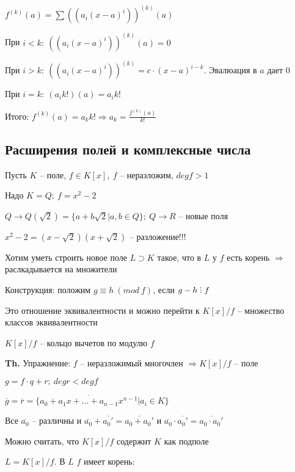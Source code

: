 \documentclass[14pt, letter paper]{article}
\def\divby{%
  \mathrel{\text{\vbox{\baselineskip.65ex\lineskiplimit0pt\hbox{.}\hbox{.}\hbox{.}}}}%
}
\begin{document}
$f^{(k)}(a) = \sum ((a_i(x - a)^i))^{(k)}(a)$

При $i < k:\ ((a_i(x - a)^i))^{(k)}(a) = 0$

При $i > k:\ ((a_i(x - a)^i))^{(k)} = c \cdot (x - a)^{i - k}$. Эвалюация в $a$ дает 0

При $i = k:\ (a_i k!)(a) = a_i k!$

Итого: $f^{(k)}(a) = a_k k! \Rightarrow a_k = \frac{f^{(k)}(a)}{k!}$

\vspace{5mm}

\begin{center}
    \section*{Расширения полей и комплексные числа}
\end{center}

Пусть $K$ -- поле, $f \in K[x],\ f$ -- неразложим, $degf > 1$

Надо $K = Q;\ f = x^2 - 2$

$Q \rightarrow Q(\sqrt{2}) = \{a + b\sqrt{2} | a, b \in Q\};\ Q \rightarrow R$ -- новые поля

$x^2 - 2 = (x - \sqrt{2})(x + \sqrt{2})$ -- разложение!!!

Хотим уметь строить новое поле $L \supset K$ такое, что в $L$ у $f$ есть корень $\Rightarrow$ раслкадывается на множители

Конструкция: положим $g \equiv h\ (mod\ f)$, если $g - h \divby f$

Это отношение эквивалентности и можно перейти к $K[x]/f$ -- множество классов эквивалентности

$K[x]/f$ -- кольцо вычетов по модулю $f$

\textbf{Th.} Упражнение: $f$ -- неразложимый многочлен $\Rightarrow K[x]/f$ -- поле

$g = f \cdot q + r;\ degr < degf$

$\overline{g} = \overline{r} = \{\overline{a_0 + a_1x + \ldots + a_{n-1}x^{n-1}} | a_i \in K\}$

Все $\overline{a_0}$ -- различны и $\overline{a_0} + \overline{a_0'} = \overline{a_0 + a_0'}$ и $\overline{a_0} \cdot \overline{a_0'} = \overline{a_0 \cdot a_0'}$

Можно считать, что $K[x]/f$ содержит $K$ как подполе

\vspace{5mm}

$L = K[x]/f$. В $L$ $f$ имеет корень:
\end{document}
